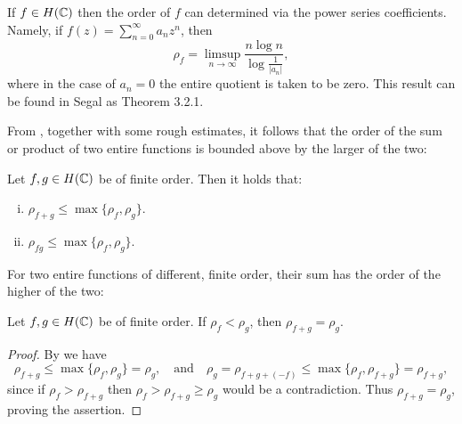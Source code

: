\begin{samepage}
\begin{remark}
    If $f \in H(\mathbb{C})$ then the order of $f$ can determined via the power series coefficients. Namely, if $f(z) = \sum_{n=0}^\infty a_n z^n$, then
    \begin{equation*}
        \rho_f = \limsup_{n \to \infty} \frac{n \log n}{\log \frac{1}{\vert a_n \vert}},
    \end{equation*}
    where in the case of $a_n = 0$ the entire quotient is taken to be zero. This result can be found in Segal \cite{segal-complex-analysis} as Theorem 3.2.1.
\end{remark}
\end{samepage}

From , together with some rough estimates, it follows that the order of the sum or product of two entire functions is bounded above by the larger of the two:

\begin{proposition} \label{prop:order-sum-product-estimate}
    Let $f, g \in H(\mathbb{C})$ be of finite order. Then it holds that:
    \begin{enumerate}[i.]
        \item $\rho_{f + g} \leq \max \{ \rho_f, \rho_g \}$.
        \item $\rho_{fg} \leq \max \{ \rho_f, \rho_g \}$.
    \end{enumerate}
\end{proposition}

For two entire functions of different, finite order, their sum has the order of the higher of the two:

\begin{proposition} \label{prop:order-sum-equality}
    Let $f, g \in H(\mathbb{C})$ be of finite order. If $\rho_f < \rho_g$, then $\rho_{f + g} = \rho_g$.
\end{proposition}

\begin{proof}
    By  we have 
    \begin{equation*}
        \rho_{f+g} \leq \max \{ \rho_f, \rho_g \} = \rho_g, \quad\textrm{and}\quad \rho_g = \rho_{f+g+(-f)} \leq \max \{ \rho_f, \rho_{f+g} \} = \rho_{f+g},
    \end{equation*}
    since if $\rho_f > \rho_{f+g}$ then $\rho_f > \rho_{f+g} \geq \rho_g$ would be a contradiction. Thus $\rho_{f+g} = \rho_g$, proving the assertion.
\end{proof}

